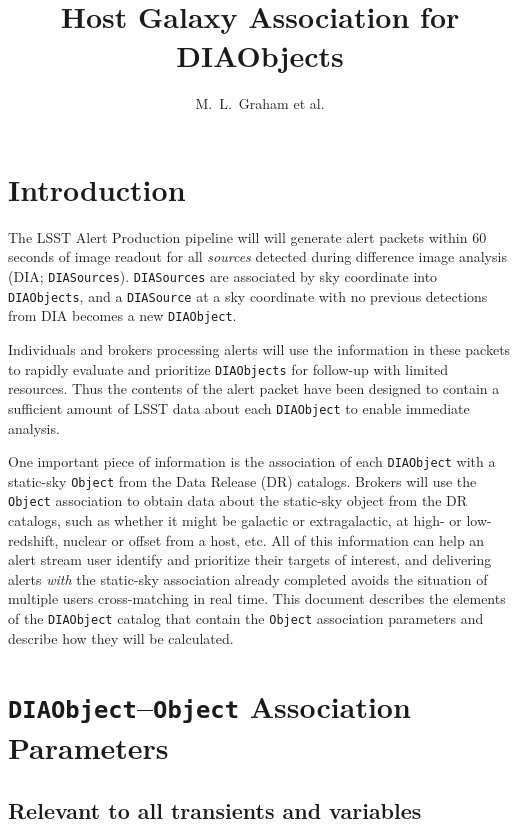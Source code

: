 \documentclass[DM,authoryear,toc]{lsstdoc}
\title{Host Galaxy Association for DIAObjects}
\author{%
M.~L.~Graham et al.
}
\date{\vcsDate}
\begin{document}
\maketitle

\section{Introduction} \label{sec:intro}

The LSST Alert Production pipeline will will generate alert packets within $60$ seconds of image readout for all \textit{sources} detected during difference image analysis (DIA; {\tt DIASources}).
{\tt DIASources} are associated by sky coordinate into {\tt DIAObjects}, and a {\tt DIASource} at a sky coordinate with no previous detections from DIA becomes a new {\tt DIAObject}.

Individuals and brokers processing alerts will use the information in these packets to rapidly evaluate and prioritize {\tt DIAObjects} for follow-up with limited resources.
Thus the contents of the alert packet have been designed to contain a sufficient amount of LSST data about each {\tt DIAObject} to enable immediate analysis.

One important piece of information is the association of each {\tt DIAObject} with a static-sky {\tt Object} from the Data Release (DR) catalogs.
Brokers will use the {\tt Object} association to obtain data about the static-sky object from the DR catalogs, such as whether it might be galactic or extragalactic, at high- or low-redshift, nuclear or offset from a host, etc.
All of this information can help an alert stream user identify and prioritize their targets of interest, and delivering alerts \emph{with} the static-sky association already completed avoids the situation of multiple users cross-matching in real time.
This document describes the elements of the {\tt DIAObject} catalog that contain the {\tt Object} association parameters and describe how they will be calculated. 


\section{{\tt DIAObject}--{\tt Object} Association Parameters}\label{sec:params}

\subsection{Relevant to all transients and variables}\label{ssec:params_all}
\end{document}
